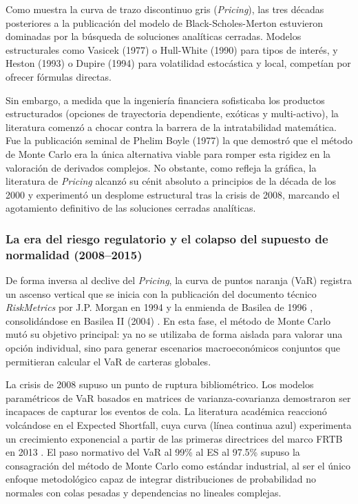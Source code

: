 \documentclass[11pt]{article}
\begin{document}
Como muestra la curva de trazo discontinuo gris (\textit{Pricing}), las tres décadas posteriores a la publicación del modelo de Black-Scholes-Merton estuvieron dominadas por la búsqueda de soluciones analíticas cerradas. Modelos estructurales como Vasicek (1977) \cite{vasicek1977equilibrium} o Hull-White (1990) \cite{hull1990pricing} para tipos de interés, y Heston (1993) \cite{heston1993closed} o Dupire (1994) \cite{dupire1994pricing} para volatilidad estocástica y local, competían por ofrecer fórmulas directas.

Sin embargo, a medida que la ingeniería financiera sofisticaba los productos estructurados (opciones de trayectoria dependiente, exóticas y multi-activo), la literatura comenzó a chocar contra la barrera de la intratabilidad matemática. Fue la publicación seminal de Phelim Boyle (1977) \cite{boyle1977options} la que demostró que el método de Monte Carlo era la única alternativa viable para romper esta rigidez en la valoración de derivados complejos. No obstante, como refleja la gráfica, la literatura de \textit{Pricing} alcanzó su cénit absoluto a principios de la década de los 2000 y experimentó un desplome estructural tras la crisis de 2008, marcando el agotamiento definitivo de las soluciones cerradas analíticas.

\subsubsection{La era del riesgo regulatorio y el colapso del supuesto de normalidad (2008--2015)}

De forma inversa al declive del \textit{Pricing}, la curva de puntos naranja (VaR) registra un ascenso vertical que se inicia con la publicación del documento técnico \textit{RiskMetrics} por J.P. Morgan en 1994 \cite{jpmorgan1994riskmetrics} y la enmienda de Basilea de 1996 \cite{bcbs1996amendment}, consolidándose en Basilea II (2004) \cite{bcbs2004basel2}. En esta fase, el método de Monte Carlo mutó su objetivo principal: ya no se utilizaba de forma aislada para valorar una opción individual, sino para generar escenarios macroeconómicos conjuntos que permitieran calcular el VaR de carteras globales.

La crisis de 2008 supuso un punto de ruptura bibliométrico. Los modelos paramétricos de VaR basados en matrices de varianza-covarianza demostraron ser incapaces de capturar los eventos de cola. La literatura académica reaccionó volcándose en el Expected Shortfall, cuya curva (línea continua azul) experimenta un crecimiento exponencial a partir de las primeras directrices del marco FRTB en 2013 \cite{bcbs2013frtb}. El paso normativo del VaR al 99\% al ES al 97.5\% supuso la consagración del método de Monte Carlo como estándar industrial, al ser el único enfoque metodológico capaz de integrar distribuciones de probabilidad no normales con colas pesadas y dependencias no lineales complejas.
\end{document}

